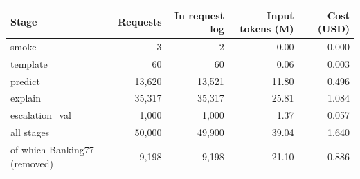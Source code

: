 \begin{tabular}{lrrrr}
\toprule
Stage & Requests & In request log & Input tokens (M) & Cost (USD) \\
\midrule
smoke & 3 & 2 & 0.00 & 0.000 \\
template & 60 & 60 & 0.06 & 0.003 \\
predict & 13{,}620 & 13{,}521 & 11.80 & 0.496 \\
explain & 35{,}317 & 35{,}317 & 25.81 & 1.084 \\
escalation\_val & 1{,}000 & 1{,}000 & 1.37 & 0.057 \\
\midrule
all stages & 50{,}000 & 49{,}900 & 39.04 & 1.640 \\
of which Banking77 (removed) & 9{,}198 & 9{,}198 & 21.10 & 0.886 \\
\bottomrule
\end{tabular}
